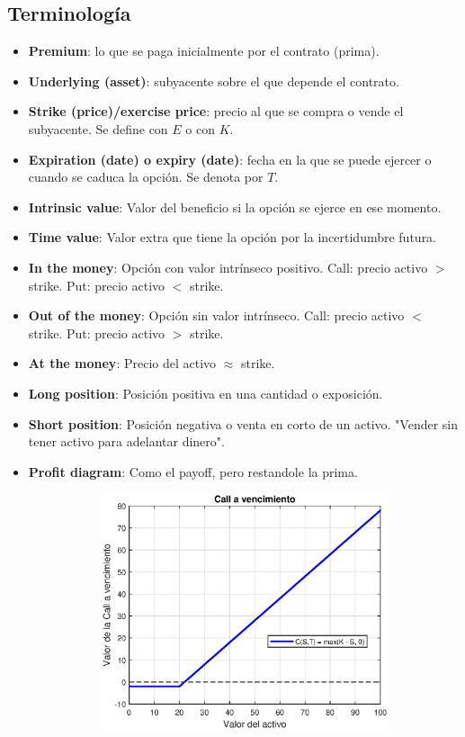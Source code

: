 \subsection{Terminología}
\begin{itemize}
    \item \textbf{Premium}: lo que se paga inicialmente por el contrato (prima).
    \item \textbf{Underlying (asset)}: subyacente sobre el que depende el contrato.
    \item \textbf{Strike (price)/exercise price}: precio al que se compra o vende el subyacente. Se define con $E$ o con $K$.
    \item \textbf{Expiration (date) o expiry (date)}: fecha en la que se puede ejercer o cuando se caduca la opción. Se denota por $T$.
    \item \textbf{Intrinsic value}: Valor del beneficio si la opción se ejerce en ese momento.
    \item \textbf{Time value}: Valor extra que tiene la opción por la incertidumbre futura.
    \item \textbf{In the money}: Opción con valor intrínseco positivo. Call: precio activo $>$ strike. Put: precio activo $<$ strike.
    \item \textbf{Out of the money}: Opción sin valor intrínseco. Call: precio activo $<$ strike. Put: precio activo $>$ strike.
    \item \textbf{At the money}: Precio del activo $\approx$ strike.
    \item \textbf{Long position}: Posición positiva en una cantidad o exposición.
    \item \textbf{Short position}: Posición negativa o venta en corto de un activo. "Vender sin tener activo para adelantar dinero".
    \item \textbf{Profit diagram}: Como el payoff, pero restandole la prima.
    \begin{figure}[H]
        \centering
        \begin{subfigure}[b]{0.45\linewidth}
            \includegraphics[width=\linewidth]{Imagenes/2_Derivados/ProfitDiagCall.eps}

\end{subfigure}
\end{figure}
\end{itemize}

